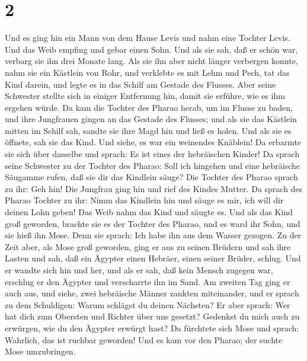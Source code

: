 \hypertarget{section-1}{%
\section{2}\label{section-1}}

 Und es ging hin ein Mann von dem Hause Levis und nahm
eine Tochter Levis.  Und das Weib empfing und gebar einen
Sohn. Und als sie sah, daß er schön war, verbarg sie ihn drei Monate
lang.  Als sie ihn aber nicht länger verbergen konnte,
nahm sie ein Kästlein von Rohr, und verklebte es mit Lehm und Pech, tat
das Kind darein, und legte es in das Schilf am Gestade des Flusses.
 Aber seine Schwester stellte sich in einiger Entfernung
hin, damit sie erführe, wie es ihm ergehen würde.  Da kam
die Tochter des Pharao herab, um im Flusse zu baden, und ihre Jungfrauen
gingen an das Gestade des Flusses; und als sie das Kästlein mitten im
Schilf sah, sandte sie ihre Magd hin und ließ es holen. 
Und als sie es öffnete, sah sie das Kind. Und siehe, es war ein
weinendes Knäblein! Da erbarmte sie sich über dasselbe und sprach: Es
ist eines der hebräischen Kinder!  Da sprach seine
Schwester zu der Tochter des Pharao: Soll ich hingehen und eine
hebräische Säugamme rufen, daß sie dir das Kindlein säuge?
 Die Tochter des Pharao sprach zu ihr: Geh hin! Die
Jungfrau ging hin und rief des Kindes Mutter.  Da sprach
des Pharao Tochter zu ihr: Nimm das Kindlein hin und säuge es mir, ich
will dir deinen Lohn geben! Das Weib nahm das Kind und säugte es.
 Und als das Kind groß geworden, brachte sie es der
Tochter des Pharao, und es ward ihr Sohn, und sie hieß ihn Mose. Denn
sie sprach: Ich habe ihn aus dem Wasser gezogen.  Zu der
Zeit aber, als Mose groß geworden, ging er aus zu seinen Brüdern und sah
ihre Lasten und sah, daß ein Ägypter einen Hebräer, einen seiner Brüder,
schlug.  Und er wandte sich hin und her, und als er sah,
daß kein Mensch zugegen war, erschlug er den Ägypter und verscharrte ihn
im Sand.  Am zweiten Tag ging er auch aus, und siehe,
zwei hebräische Männer zankten miteinander, und er sprach zu dem
Schuldigen: Warum schlägst du deinen Nächsten?  Er aber
sprach: Wer hat dich zum Obersten und Richter über uns gesetzt? Gedenkst
du mich auch zu erwürgen, wie du den Ägypter erwürgt hast? Da fürchtete
sich Mose und sprach: Wahrlich, das ist ruchbar geworden!
 Und es kam vor den Pharao; der suchte Mose umzubringen.
